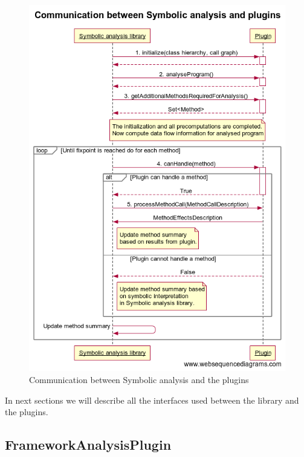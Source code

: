 \begin{figure}[p]
  \centering
  \includegraphics[trim={0cm 0.75cm 0cm 1.4cm},clip,width=\textwidth]{img/analysis-plugins-communication.png}
  \caption{Communication between Symbolic analysis and the plugins}
  \label{implementation:analysis-plugins-communication}
\end{figure}

In next sections we will describe all the interfaces used between the library and the plugins.



\subsection{FrameworkAnalysisPlugin}

